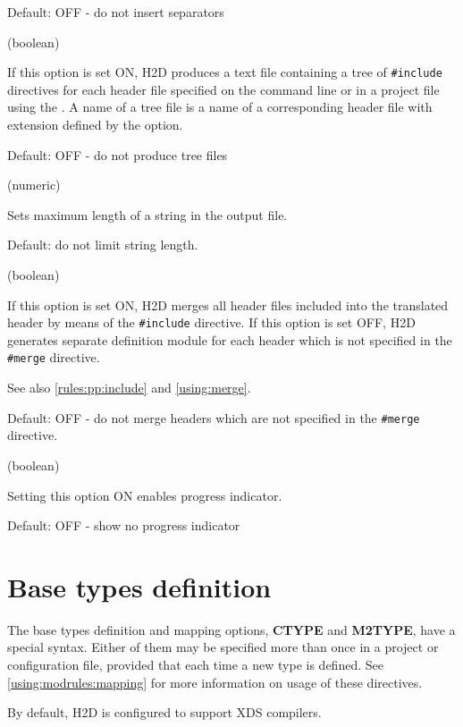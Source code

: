 \begin{description}
Default: OFF - do not insert separators

 (boolean)

If this option is set ON, H2D produces a text file containing
a tree of \verb'#include' directives for each header file specified
on the command line or in a project file using the .
A name of a tree file is a name of a corresponding header file
with extension defined by the  option.

Default: OFF - do not produce tree files

 (numeric)

Sets maximum length of a string in the output file.

Default: do not limit string length.

 (boolean)

If this option is set ON, H2D merges all header files included into the
translated header by means of the {\tt \#include} directive.
If this option is set OFF, H2D generates separate definition module
for each header which is not specified in the {\tt \#merge} directive.

See also \ref{rules:pp:include} and \ref{using:merge}.

Default: OFF - do not merge headers which are not specified
               in the {\tt \#merge} directive.

 (boolean)

Setting this option ON enables progress indicator.

Default: OFF - show no progress indicator

\ifonline \else
\end{description}
\fi

\section{Base types definition}

The base types definition and mapping options, {\bf CTYPE} and {\bf M2TYPE},
have a special syntax. Either of them may be specified more than once
in a project or configuration file, provided that each time a new type is
defined. See \ref{using:modrules:mapping} for more information on usage
of these directives.

By default, H2D is configured to support XDS compilers.

